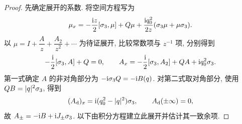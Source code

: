 \begin{proof}
先确定展开的系数. 将空间方程写为
\begin{equation}\label{eq:mu-highenergy-system}
\mu_x=-\dfrac{\mathrm{i} z}{2}[\sigma_3,\mu]+Q\mu
+\dfrac{\mathrm{i} q_0^2}{2z}(\sigma_3\mu+\mu\sigma_3).
\end{equation}
以 $\mu=I+\dfrac{A}{z}+\dfrac{A_2}{z^2}+\cdots$ 为待证展开, 比较常数项与 $z^{-1}$ 项, 分别得到
\begin{equation*}
-\dfrac{\mathrm{i}}{2}[\sigma_3,A]+Q=0,\qquad
A_x=-\dfrac{\mathrm{i}}{2}[\sigma_3,A_2]+QA+\mathrm{i} q_0^2\sigma_3.
\end{equation*}
第一式确定 $A$ 的非对角部分为 $-\mathrm{i}\sigma_3 Q=-\mathrm{i} B(q)$. 对第二式取对角部分, 使用 $QB=|q|^2\sigma_3$, 得到
\begin{equation*}
(A_{\rm d})_x=\mathrm{i}(q_0^2-|q|^2)\sigma_3,\qquad
A_{\rm d}(\pm\infty)=0,
\end{equation*}
故 $A_\pm=-\mathrm{i} B+\mathrm{i} J_\pm\sigma_3$. 以下由积分方程建立此展开并估计其一致余项.


\end{proof}
